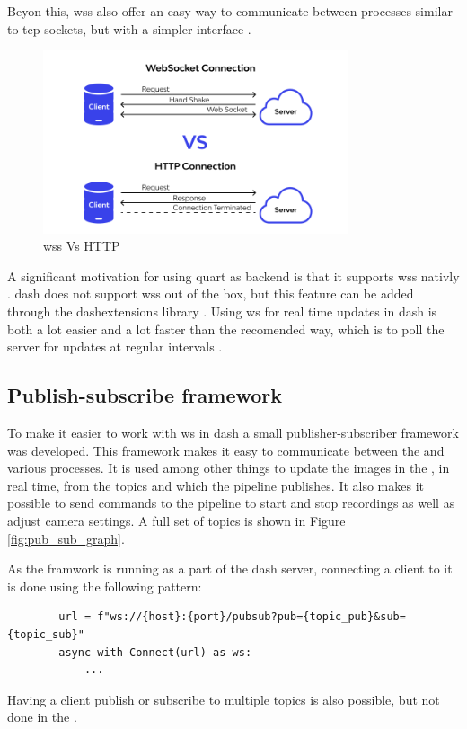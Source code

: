 Beyon this, \glspl{ws} also offer an easy way to communicate between processes similar to \gls{tcp} sockets, but with a simpler interface \cite{kanakaAnswerDifferencesTCP2013}.
\begin{figure}[H]
    \centering
    \includegraphics[width=0.8\textwidth]{figures/gui/http_vs_ws.png}
    \caption{\glspl{ws} Vs HTTP \cite{wallarmWebSocketVsHTTP}}
    \label{fig:websockets_vs_http}
\end{figure}

A significant motivation for using \gls{quart} as backend is that it supports \glspl{ws} nativly \cite{quartUsingWebsocketsQuart}.
\gls{dash} does not support \glspl{ws} out of the box, but this feature can be added through the \gls{dashextensions} library \cite{eriksenDashExtensionsWebSocket}.
Using \gls{ws} for real time updates in \gls{dash} is both a lot easier and a lot faster than the recomended way, which is to poll the server for updates at regular intervals \cite{plotlyLiveUpdatesDash}.

\subsection{Publish-subscribe framework}
\label{sec:pubsub}
To make it easier to work with \gls{ws} in \gls{dash} a small publisher-subscriber framework was developed.
This framework makes it easy to communicate between the \srgui and various processes.
It is used among other things to update the images in the \srgui, in real time, from the topics  and  which the \gls{pipeline} publishes.
It also makes it possible to send commands to the \gls{pipeline} to start and stop recordings as well as adjust camera settings.
A full set of topics is shown in Figure \ref{fig:pub_sub_graph}.

As the framwork is running as a part of the \gls{dash} server, connecting a client to it is done using the following pattern:
\begin{verbatim}
        url = f"ws://{host}:{port}/pubsub?pub={topic_pub}&sub={topic_sub}"
        async with Connect(url) as ws:
            ...
\end{verbatim}
Having a client publish or subscribe to multiple topics is also possible, but not done in the \srgui.



